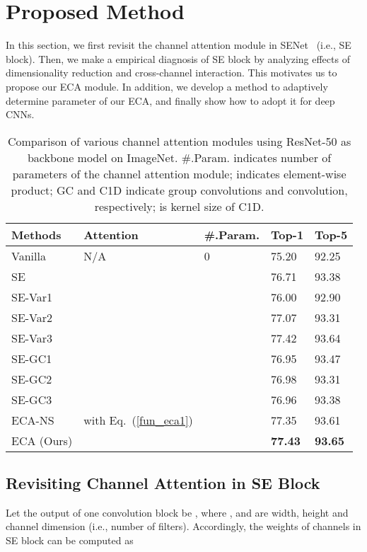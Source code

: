 \documentclass[10pt,twocolumn,letterpaper]{article}
\begin{document}
\section{Proposed Method}
In this section, we first revisit the channel attention module in SENet~\cite{SENet18} (i.e., SE block). Then, we make a empirical diagnosis of SE block by analyzing effects of dimensionality reduction and cross-channel interaction. This motivates us to propose our ECA module. In addition, we develop a method to adaptively determine parameter of our ECA, and finally show how to adopt it for deep CNNs.

\begin{table}[t]
	\centering
	\footnotesize
	\begin{tabular}{lllll}
		\hline
		Methods & Attention & \#.Param. & Top-1 & Top-5 \\
		\hline
		Vanilla  & N/A & 0 & 75.20 & 92.25 \\
		SE  &  &  & 76.71 & 93.38 \\
		\hline
		SE-Var1  &  &  & 76.00 & 92.90 \\
		SE-Var2  &  &  & 77.07 & 93.31 \\
		SE-Var3  &  &  & 77.42 & 93.64 \\ 
		\hline
		SE-GC1  &  &  & 76.95 & 93.47 \\
		SE-GC2  &  &  & 76.98 & 93.31 \\
		SE-GC3  &  &  & 76.96 & 93.38 \\
		\hline
		ECA-NS  &  with Eq.~(\ref{fun_eca1}) &  & 77.35 & 93.61 \\
		ECA (Ours)  &  &  & \textbf{77.43} & \textbf{93.65} \\
		\hline
	\end{tabular}
	\smallskip
	\caption{Comparison of various channel attention modules using ResNet-50 as backbone model on ImageNet. \#.Param. indicates number of parameters of the channel attention module;  indicates element-wise product; GC and C1D indicate group convolutions and  convolution, respectively;  is kernel size of C1D.}\smallskip
	\label{table:channel_keep}	
\end{table}

\subsection{Revisiting Channel Attention in SE Block}
Let the output of one convolution block be , where ,  and  are width, height and channel dimension (i.e., number of filters). Accordingly, the weights of channels in SE block can be computed as
\end{document}
